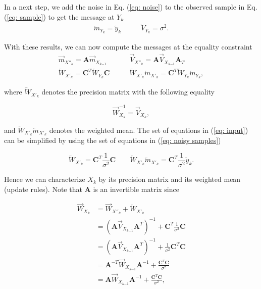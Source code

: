 \documentclass[11pt,a4paper,twoside]{report}
\newcommand{\messF}[3]{\overrightarrow{#1}_{{#2}_{k{#3}}}}
\newcommand{\messB}[3]{\overleftarrow{#1}_{{#2}_{k{#3}}}}
\newcommand{\mat}[1]{\mathbf{#1}}
\begin{document}
In a next step, we add the noise in Eq. (\ref{eq: noise}) to the observed sample in Eq. (\ref{eq: sample}) to get the message at $Y_k$
\begin{align}
	\label{eq: noisy samples}
	\messB{m}{Y}{} = \tilde{y}_k \qquad &\messB{V}{Y}{} =  \sigma^2.
\end{align}

With these results, we can now compute the messages at the equality constraint
\begin{align}
	\label{eq: previous state}
	\messF{m}{X''}{} = \mat{A}\messF{m}{X}{-1} \qquad &\messF{V}{X''}{} = \mat{A}\messF{V}{X}{-1}\mat{A}_T \\
	\label{eq: input}
	\messB{W}{X'}{} = \mat{C}^T\messB{W}{Y}{}\mat{C}  \qquad &\messB{W}{X'}{}\messB{m}{X'}{} = \mat{C}^T\messB{W}{Y}{}\messB{m}{Y}{},
\end{align}

where $\messB{W}{X'}{}$ denotes the precision matrix with the following equality

\begin{equation*}
	\messF{W}{X}{}^{-1} = \messF{V}{X}{},
\end{equation*}

and $\messB{W}{X'}{}\messB{m}{X'}{}$ denotes the weighted mean. The set of equations in (\ref{eq: input}) can be simplified by using the set of equations in (\ref{eq: noisy samples})

\begin{equation*}
	\messB{W}{X'}{} = \mat{C}^T\frac{1}{\sigma^2}\mat{C}  \qquad \messB{W}{X'}{}\messB{m}{X'}{} = \mat{C}^T\frac{1}{\sigma^2}\tilde{y}_k.
\end{equation*}


Hence we can characterize $X_k$ by its precision matrix and its weighted mean (update rules). Note that $\mat{A}$ is an invertible matrix since 

\begin{align}
  \label{eq: precision matrix}
  \messF{W}{X}{} &= \messF{W}{X''}{} + \messB{W}{X'}{} \\
  &= \left(\mat{A}\messF{V}{X}{-1}\mat{A}^T\right)^{-1} + \mat{C}^T\frac{1}{\sigma^2}\mat{C} \\
  & = \left(\mat{A}\messF{V}{X}{-1}\mat{A}^T\right)^{-1} + \frac{1}{\sigma^2}\mat{C}^T\mat{C} \\
  & = \mat{A}^{-T}\messF{W}{X}{-1}\mat{A}^{-1} + \frac{\mat{C}^T\mat{C}}{\sigma^2}  \\
  & = \mat{A}\messF{W}{X}{-1}\mat{A}^{-1} + \frac{\mat{C}^T\mat{C}}{\sigma^2},
\end{align}
\end{document}
